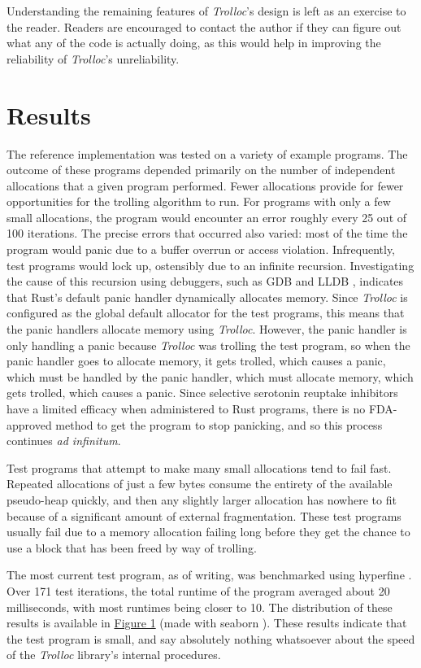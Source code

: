 \documentclass{article}
\begin{document}
Understanding the remaining features of \textit{Trolloc}'s design is left as an exercise to the reader. Readers are encouraged to contact the author if they can figure out what any of the code is actually doing, as this would help in improving the reliability of \textit{Trolloc}'s unreliability.

\section{Results}
The reference implementation was tested on a variety of example programs. The outcome of these programs depended primarily on the number of independent allocations that a given program performed. Fewer allocations provide for fewer opportunities for the trolling algorithm to run. For programs with only a few small allocations, the program would encounter an error roughly every 25 out of 100 iterations. The precise errors that occurred also varied: most of the time the program would panic due to a buffer overrun or access violation. Infrequently, test programs would lock up, ostensibly due to an infinite recursion. Investigating the cause of this recursion using debuggers, such as GDB \cite{gdb} and LLDB \cite{lldb}, indicates that Rust's default panic handler dynamically allocates memory. Since \textit{Trolloc} is configured as the global default allocator for the test programs, this means that the panic handlers allocate memory using \textit{Trolloc}. However, the panic handler is only handling a panic because \textit{Trolloc} was trolling the test program, so when the panic handler goes to allocate memory, it gets trolled, which causes a panic, which must be handled by the panic handler, which must allocate memory, which gets trolled, which causes a panic. Since selective serotonin reuptake inhibitors have a limited efficacy when administered to Rust programs, there is no FDA-approved method to get the program to stop panicking, and so this process continues \textit{ad infinitum}.

Test programs that attempt to make many small allocations tend to fail fast. Repeated allocations of just a few bytes consume the entirety of the available pseudo-heap quickly, and then any slightly larger allocation has nowhere to fit because of a significant amount of external fragmentation. These test programs usually fail due to a memory allocation failing long before they get the chance to use a block that has been freed by way of trolling.

The most current test program, as of writing, was benchmarked using hyperfine \cite{hyperfine}. Over 171 test iterations, the total runtime of the program averaged about 20 milliseconds, with most runtimes being closer to 10. The distribution of these results is available in \hyperref[fig1:times]{Figure 1} (made with seaborn \cite{seaborn}). These results indicate that the test program is small, and say absolutely nothing whatsoever about the speed of the \textit{Trolloc} library's internal procedures.
\end{document}
